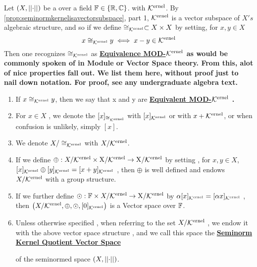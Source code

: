 \label{def:equivalencemodseminormkernel}
\newcommand{\EquivelanceModKernel}[0]{
    \bf \hyperref[def:equivalencemodseminormkernel]{Equivalence MOD-$\Ker$} \rm
}
\newcommand{\EquivalenceModKernel}[0]{
    \bf \hyperref[def:equivalencemodseminormkernel]{Equivalence MOD-$\Ker$} \rm
}
\newcommand{\EquivalentModKernel}[0]{
    \bf \hyperref[def:equivalencemodseminormkernel]{Equivalent MOD-$\Ker$} \rm
}
\newcommand{\SeminormKernelQuotientVectorSpace}[0]{
    \bf \hyperref[def:equivalencemodseminormkernel]{Seminorm Kernel Quotient Vector Space} \rm
}

\begin{df}
Let $(X,\left|\left| \cdot \right|\right|)$ be a \SeminormedSpace over a field $\mathbb{F} \in \{\mathbb{R},\mathbb{C}\}$.
with \SeminormKernel $\bf\mathcal{K}\rm^{ernel}$.
By \ref{prop:seminormkernelisavectorsubspace}, part 1, 
$\bf\mathcal{K}\rm^{ernel}$ is a vector subspace of $X's$ algebraic structure, and so if we define 
$\cong_{\bf\mathcal{K}\rm^{ernel}} \subset X \times X$ by setting, for $x,y \in X$
\begin{equation}
x \cong_{\bf\mathcal{K}\rm^{ernel}} y \iff x-y \in \bf\mathcal{K}\rm^{ernel}
\end{equation}
Then one recognizes $\cong_{\bf\mathcal{K}\rm^{ernel}}$ as \EquivelanceModKernel as would be commonly spoken of in Module or Vector Space theory. 
From this, alot of nice properties fall out. We list them here, without proof just to nail down notation. 
For proof, see any undergraduate algebra text.
\begin{enumerate}
\item If $x \cong_{\bf\mathcal{K}\rm^{ernel}} y$, then we say that x and y are \EquivalentModKernel. 
\item For $x \in X$
    , we denote the \EquivalenceClass $[x]_{\cong_{\bf\mathcal{K}\rm^{ernel}}}$ with 
    $[x]_{\bf\mathcal{K}\rm^{ernel}}$ or 
    with $x+\bf\mathcal{K}\rm^{ernel}$, or 
    when confusion is unlikely, simply $[x]$. 
\item We denote $X/\cong_{\bf\mathcal{K}\rm^{ernel}}$ with $X/\bf\mathcal{K}\rm^{ernel}$. 
\item If we define $\oplus:X/\bf\mathcal{K}\rm^{ernel} \times X/\bf\mathcal{K}\rm^{ernel} \to X/\bf\mathcal{K}\rm^{ernel}$ by setting
    , for $x,y \in X$, $[x]_{\bf\mathcal{K}\rm^{ernel}}\oplus[y]_{\bf\mathcal{K}\rm^{ernel}}=[x+y]_{\bf\mathcal{K}\rm^{ernel}}$
    , then $\oplus$ is well defined and endows $X/\bf\mathcal{K}\rm^{ernel}$ with a group structure. 
\item If we further define $\odot:\mathbb{F} \times X/\bf\mathcal{K}\rm^{ernel} \to X/\bf\mathcal{K}\rm^{ernel}$ by 
    $\alpha [x]_{\bf\mathcal{K}\rm^{ernel}}=[\alpha x]_{\bf\mathcal{K}\rm^{ernel}}$
    , then $\left( X/\bf\mathcal{K}\rm^{ernel}, \oplus, \odot, [0]_{\bf\mathcal{K}\rm^{ernel}}\right)$ is a Vector space over $\mathbb{F}$. 
\item Unless otherwise specified
    , when referring to the set $X/\bf\mathcal{K}\rm^{ernel}$
    , we endow it with the above vector space structure
    , and we call this space the \SeminormKernelQuotientVectorSpace 
    of the seminormed space $(X, \left|\left| \cdot \right|\right|)$.
\end{enumerate}
\end{df}

